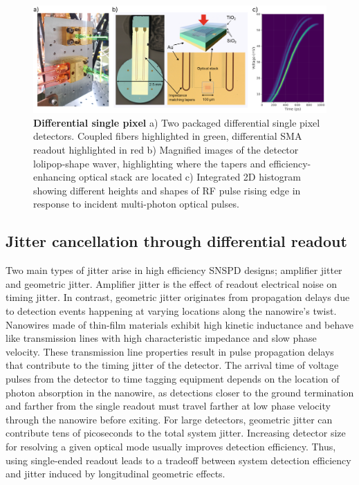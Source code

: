 \documentclass[11pt]{caltech_thesis} %
\begin{document}
\hypertarget{fig:diff}{%
\begin{figure}
\centering
\includegraphics{./chapter_01/figs/diff_light.png}
\caption[{Differential Single Pixel}]{\textbf{Differential single pixel} a) Two packaged differential single pixel detectors. Coupled fibers highlighted in green, differential SMA readout highlighted in red b) Magnified images of the detector lolipop-shape waver, highlighting where the tapers and efficiency-enhancing optical stack are located c) Integrated 2D histogram showing different heights and shapes of RF pulse rising edge in response to incident multi-photon optical pulses.}
\label{fig:diff}
\end{figure}
}

\hypertarget{jitter-cancellation-through-differential-readout}{%
\subsection{Jitter cancellation through differential readout}\label{jitter-cancellation-through-differential-readout}}

Two main types of jitter arise in high efficiency SNSPD designs; amplifier jitter and geometric jitter. Amplifier jitter is the effect of readout electrical noise on timing jitter. In contrast, geometric jitter originates from propagation delays due to detection events happening at varying locations along the nanowire's twist. Nanowires made of thin-film materials exhibit high kinetic inductance and behave like transmission lines with high characteristic impedance and slow phase velocity. These transmission line properties result in pulse propagation delays that contribute to the timing jitter of the detector. The arrival time of voltage pulses from the detector to time tagging equipment depends on the location of photon absorption in the nanowire, as detections closer to the ground termination and farther from the single readout must travel farther at low phase velocity through the nanowire before exiting. For large detectors, geometric jitter can contribute tens of picoseconds to the total system jitter. Increasing detector size for resolving a given optical mode usually improves detection efficiency. Thus, using single-ended readout leads to a tradeoff between system detection efficiency and jitter induced by longitudinal geometric effects.
\end{document}
